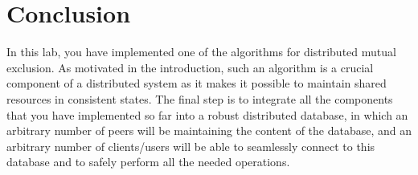 \documentclass[a4paper]{article}
\begin{document}
\section{Conclusion}
In this lab, you have implemented one of the algorithms for distributed mutual
exclusion. As motivated in the introduction, such an algorithm is a crucial
component of a distributed system as it makes it possible to maintain shared
resources in consistent states. The final step is to integrate all the
components that you have implemented so far into a robust distributed database,
in which an arbitrary number of peers will be maintaining the content of the
database, and an arbitrary number of clients/users will be able to seamlessly
connect to this database and to safely perform all the needed operations.

\printbibliography
\end{document}
